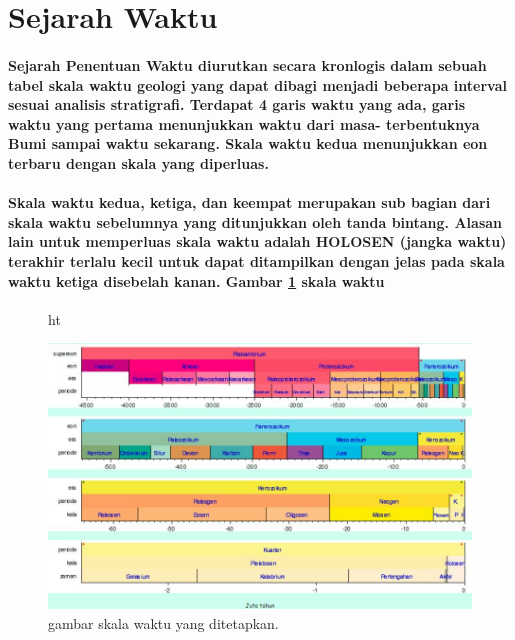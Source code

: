
\section{Sejarah Waktu}
\paragraph{Sejarah Penentuan Waktu diurutkan secara kronlogis dalam sebuah tabel skala waktu geologi 
yang dapat dibagi menjadi beberapa interval sesuai analisis stratigrafi. 
Terdapat 4 garis waktu yang ada, garis waktu yang pertama menunjukkan waktu dari masa-
terbentuknya Bumi sampai waktu sekarang\cite{suryasejarah}. 
Skala waktu kedua menunjukkan eon terbaru dengan skala yang diperluas.} 

\paragraph{Skala waktu kedua, ketiga, dan keempat merupakan sub bagian 
dari skala waktu sebelumnya yang ditunjukkan oleh tanda bintang. 
Alasan lain untuk memperluas skala waktu adalah HOLOSEN (jangka waktu) terakhir 
terlalu kecil untuk dapat ditampilkan dengan jelas
pada skala waktu ketiga disebelah kanan. Gambar \ref{sejarahpenentuan} skala waktu}

\begin{figure}{ht}
\centerline{\includegraphics[width=1\textwidth]{figures/sejarahpenentuan.JPG}}
\caption{gambar skala waktu yang ditetapkan.}
\label{sejarahpenentuan}
\end{figure}

